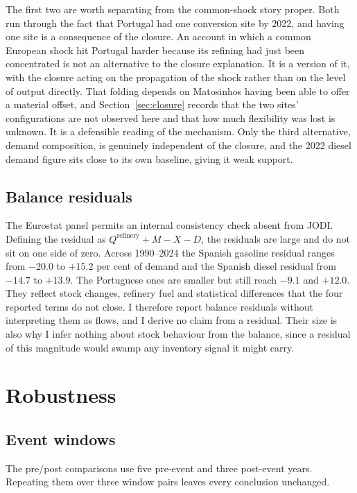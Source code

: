 \documentclass[11pt,a4paper]{article}
\begin{document}
The first two are worth separating from the common-shock story proper. Both run through the fact
that Portugal had one conversion site by 2022, and having one site is a consequence of the
closure. An account in which a common European shock hit Portugal harder because its refining
had just been concentrated is not an alternative to the closure explanation. It is a version of
it, with the closure acting on the propagation of the shock rather than on the level of output
directly. That folding depends on Matosinhos having been able to offer a material offset, and
Section~\ref{sec:closure} records that the two sites' configurations are not observed here and
that how much flexibility was lost is unknown. It is a defensible reading of the mechanism. Only
the third alternative, demand composition, is genuinely independent of the closure, and the 2022
diesel demand figure sits close to its own baseline, giving it weak support.

\subsection{Balance residuals}
\label{sec:residuals}

The Eurostat panel permits an internal consistency check absent from JODI. Defining the residual
as $Q^{\text{refinery}} + M - X - D$, the residuals are large and do not sit on one side of
zero. Across 1990--2024 the Spanish gasoline residual ranges from $-20.0$ to $+15.2$ per cent of
demand and the Spanish diesel residual from $-14.7$ to $+13.9$. The Portuguese ones are smaller
but still reach $-9.1$ and $+12.0$. They reflect stock changes, refinery fuel and statistical
differences that the four reported terms do not close. I therefore report balance residuals
without interpreting them as flows, and I derive no claim from a residual. Their size is also
why I infer nothing about stock behaviour from the balance, since a residual of this magnitude
would swamp any inventory signal it might carry.

\section{Robustness}

\subsection{Event windows}
\label{sec:windows}

The pre/post comparisons use five pre-event and three post-event years. Repeating them over three window pairs leaves every conclusion unchanged.
\end{document}
